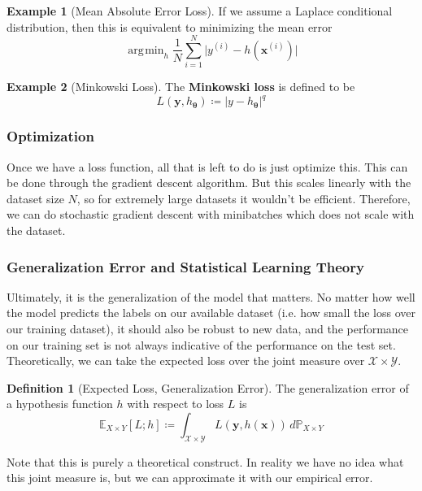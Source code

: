 \documentclass{article}
\DeclareMathOperator*{\argmin}{\arg\!\min}
\theoremstyle{definition}
\newtheorem{example}{Example}[section]
\newtheorem{definition}{Definition}[section]
\begin{document}
    \begin{example}[Mean Absolute Error Loss]
      If we assume a Laplace conditional distribution, then this is equivalent to minimizing the mean error 
        \[\argmin_h \frac{1}{N} \sum_{i=1}^N \big| y^{(i)} - h(\mathbf{x}^{(i)}) \big|\]
    \end{example}

    \begin{example}[Minkowski Loss]
      The \textbf{Minkowski loss} is defined to be 
        \[L(\mathbf{y}, h_{\boldsymbol{\theta}}) \coloneqq | y - h_{\boldsymbol{\theta}} |^q\]
    \end{example}

    \subsubsection{Optimization}

      Once we have a loss function, all that is left to do is just optimize this. This can be done through the gradient descent algorithm. But this scales linearly with the dataset size $N$, so for extremely large datasets it wouldn't be efficient. Therefore, we can do stochastic gradient descent with minibatches which does not scale with the dataset. 

    \subsubsection{Generalization Error and Statistical Learning Theory}

      Ultimately, it is the generalization of the model that matters. No matter how well the model predicts the labels on our available dataset (i.e. how small the loss over our training dataset), it should also be robust to new data, and the performance on our training set is not always indicative of the performance on the test set. Theoretically, we can take the expected loss over the joint measure over $\mathcal{X} \times \mathcal{Y}$. 

      \begin{definition}[Expected Loss, Generalization Error]
        The generalization error of a hypothesis function $h$ with respect to loss $L$ is 
          \[\mathbb{E}_{X \times Y}[L; h] \coloneqq \int_{\mathcal{X} \times \mathcal{Y}} L(\mathbf{y}, h(\mathbf{x})) \, d\mathbb{P}_{X \times Y}\]
      \end{definition}

      Note that this is purely a theoretical construct. In reality we have no idea what this joint measure is, but we can approximate it with our empirical error. 
\end{document}
